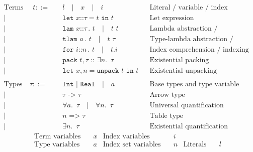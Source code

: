 \documentclass[12pt]{article}
\newcommand{\annot}[1]{\texttt{::} #1}
\newcommand{\quadbar}[0]{\quad | \quad}
\begin{document}
\vspace{-0.5cm}

\begin{align*}
\text{Terms } \quad t ::=
 & \quad l  \quadbar x \quadbar i
      && \text{Literal / variable / index variable} \\
|& \quad \texttt{let } x \annot{\tau} = t \texttt{ in } t
        && \text{Let expression} \\
|& \quad \texttt{lam } x \annot{\tau} \, \texttt {.} \,\, t
   \quadbar  t \,\, t
    && \text{Lambda abstraction / application} \\
|& \quad \texttt{tlam } a \, . \,\, t
   \quadbar t \,\, \tau
    && \text{Type-lambda abstraction / application} \\
|& \quad \texttt{for } i \annot{n} \, \texttt {.} \,\, t
   \quadbar t.i
    && \text{Index comprehension / indexing} \\
|& \quad \texttt{pack } t, \tau \texttt{ :: } \exists n. \,\,\, \tau
       && \text{Existential packing} \\
|& \quad \texttt{let } x, n = \texttt{unpack } t \texttt{ in } t
       && \text{Existential unpacking}
\\ \\
\text{Types} \quad \tau ::=
 & \quad \texttt{Int } | \texttt{ Real} \quadbar a
      && \text{Base types and type variable} \\
|& \quad \tau   \texttt{ -> } \tau  && \text{Arrow type} \\
|& \quad \forall a. \,\,\, \tau
   \quadbar \forall n. \,\,\, \tau
    && \text{Universal quantification} \\
|& \quad n  \texttt{ => } \tau  && \text{Table type} \\
|& \quad \exists n. \,\,\, \tau
    && \text{Existential quantification}
\end{align*}
%
\begin{align*}
\text{Term variables}&       \quad x &
\text{Index variables}&      \quad i  \\
\text{Type variables}&       \quad a &
\text{Index set variables}&  \quad n &
\text{Literals} & \quad l
\end{align*}
\end{document}
